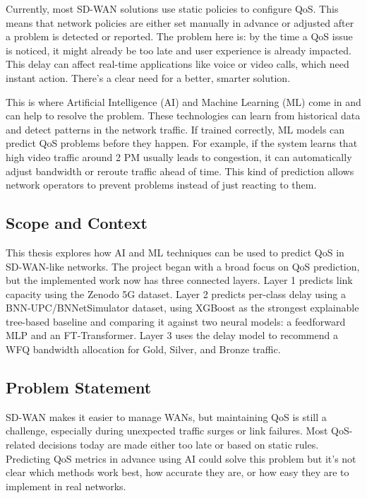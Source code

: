 \documentclass[a4paper,12pt]{Classes/RoboticsLaTeX}
\begin{document}
    Currently, most SD-WAN solutions use static policies to configure QoS. This means that network policies are either set manually in advance or adjusted after a problem is detected or reported. The problem here is: by the time a QoS issue is noticed, it might already be too late and user experience is already impacted. This delay can affect real-time applications like voice or video calls, which need instant action. There’s a clear need for a better, smarter solution.
    
    This is where Artificial Intelligence (AI) and Machine Learning (ML) come in and can help to resolve the problem. These technologies can learn from historical data and detect patterns in the network traffic. If trained correctly, ML models can predict QoS problems before they happen. For example, if the system learns that high video traffic around 2 PM usually leads to congestion, it can automatically adjust bandwidth or reroute traffic ahead of time. This kind of prediction allows network operators to prevent problems instead of just reacting to them.  
    
    \subsection*{Scope and Context}
    
    This thesis explores how AI and ML techniques can be used to predict QoS in SD-WAN-like networks. The project began with a broad focus on QoS prediction, but the implemented work now has three connected layers. Layer 1 predicts link capacity using the Zenodo 5G dataset. Layer 2 predicts per-class delay using a BNN-UPC/BNNetSimulator dataset, using XGBoost as the strongest explainable tree-based baseline and comparing it against two neural models: a feedforward MLP and an FT-Transformer. Layer 3 uses the delay model to recommend a WFQ bandwidth allocation for Gold, Silver, and Bronze traffic.
    
    \subsection*{Problem Statement}
    
    SD-WAN makes it easier to manage WANs, but maintaining QoS is still a challenge, especially during unexpected traffic surges or link failures. Most QoS-related decisions today are made either too late or based on static rules. Predicting QoS metrics in advance using AI could solve this problem but it’s not clear which methods work best, how accurate they are, or how easy they are to implement in real networks.
    
\end{document}
